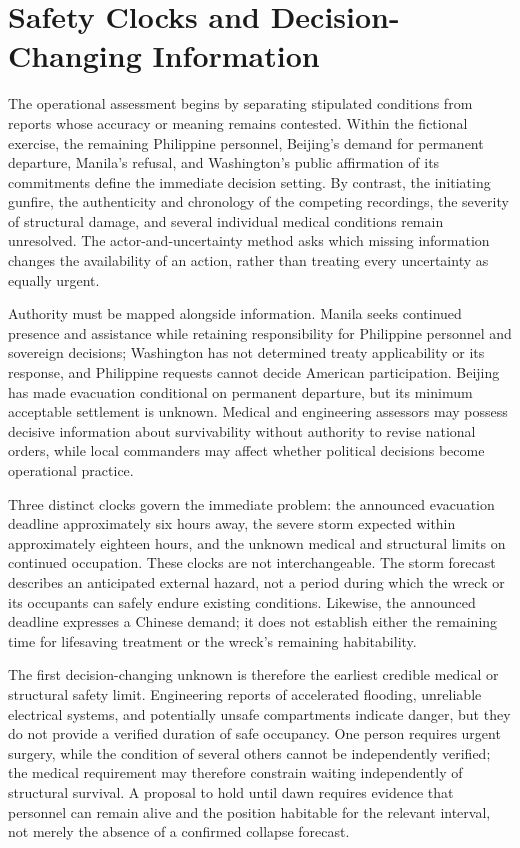\documentclass[11pt]{article}
\begin{document}
\section{Safety Clocks and Decision-Changing Information}
The operational assessment begins by separating stipulated conditions from reports whose accuracy or meaning remains contested. Within the fictional exercise, the remaining Philippine personnel, Beijing’s demand for permanent departure, Manila’s refusal, and Washington’s public affirmation of its commitments define the immediate decision setting. By contrast, the initiating gunfire, the authenticity and chronology of the competing recordings, the severity of structural damage, and several individual medical conditions remain unresolved. The actor-and-uncertainty method asks which missing information changes the availability of an action, rather than treating every uncertainty as equally urgent.

Authority must be mapped alongside information. Manila seeks continued presence and assistance while retaining responsibility for Philippine personnel and sovereign decisions; Washington has not determined treaty applicability or its response, and Philippine requests cannot decide American participation. Beijing has made evacuation conditional on permanent departure, but its minimum acceptable settlement is unknown. Medical and engineering assessors may possess decisive information about survivability without authority to revise national orders, while local commanders may affect whether political decisions become operational practice.

Three distinct clocks govern the immediate problem: the announced evacuation deadline approximately six hours away, the severe storm expected within approximately eighteen hours, and the unknown medical and structural limits on continued occupation. These clocks are not interchangeable. The storm forecast describes an anticipated external hazard, not a period during which the wreck or its occupants can safely endure existing conditions. Likewise, the announced deadline expresses a Chinese demand; it does not establish either the remaining time for lifesaving treatment or the wreck’s remaining habitability.

The first decision-changing unknown is therefore the earliest credible medical or structural safety limit. Engineering reports of accelerated flooding, unreliable electrical systems, and potentially unsafe compartments indicate danger, but they do not provide a verified duration of safe occupancy. One person requires urgent surgery, while the condition of several others cannot be independently verified; the medical requirement may therefore constrain waiting independently of structural survival. A proposal to hold until dawn requires evidence that personnel can remain alive and the position habitable for the relevant interval, not merely the absence of a confirmed collapse forecast.
\end{document}
